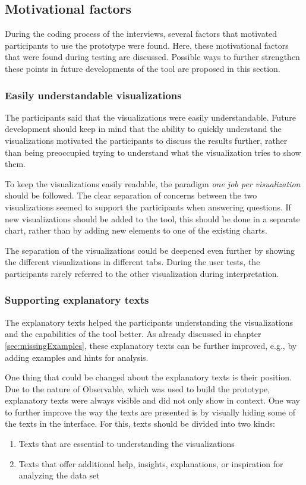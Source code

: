 \subsection{Motivational factors}
During the coding process of the interviews, several factors that motivated participants to use the prototype were found. Here, these motivational factors that were found during testing are discussed. Possible ways to further strengthen these points in future developments of the tool are proposed in this section.

\subsubsection*{Easily understandable visualizations}
The participants said that the visualizations were easily understandable. Future development should keep in mind that the ability to quickly understand the visualizations motivated the participants to discuss the results further, rather than being preoccupied trying to understand what the visualization tries to show them.

To keep the visualizations easily readable, the paradigm \emph{one job per visualization} should be followed. The clear separation of concerns between the two visualizations seemed to support the participants when answering questions. If new visualizations should be added to the tool, this should be done in a separate chart, rather than by adding new elements to one of the existing charts.

The separation of the visualizations could be deepened even further by showing the different visualizations in different tabs. During the user tests, the participants rarely referred to the other visualization during interpretation.

\subsubsection*{Supporting explanatory texts}
The explanatory texts helped the participants understanding the visualizations and the capabilities of the tool better. As already discussed in chapter \ref{sec:missingExamples}, these explanatory texts can be further improved, e.g., by adding examples and hints for analysis.

One thing that could be changed about the explanatory texts is their position. Due to the nature of Observable, which was used to build the prototype, explanatory texts were always visible and did not only show in context. One way to further improve the way the texts are presented is by visually hiding some of the texts in the interface. For this, texts should be divided into two kinds:
\begin{enumerate}
    \item Texts that are essential to understanding the visualizations
    \item Texts that offer additional help, insights, explanations, or inspiration for analyzing the data set
\end{enumerate}

